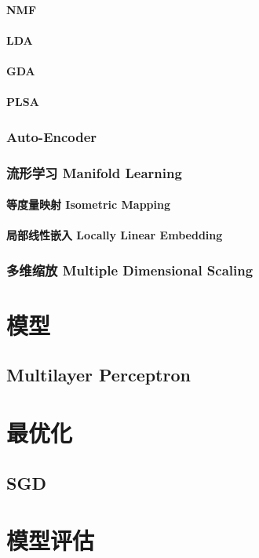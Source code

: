 \documentclass[oneside]{book}
\begin{document}
				\subsubsection{NMF}
				\subsubsection{LDA}
				\subsubsection{GDA}
				\subsubsection{PLSA}
				\subsection{Auto-Encoder}
				\subsection{流形学习 Manifold Learning}
					\subsubsection{等度量映射 Isometric Mapping}
					\subsubsection{局部线性嵌入 Locally Linear Embedding}
			\subsection{多维缩放 Multiple Dimensional Scaling}
			
		
	\chapter{模型}
		\section{Multilayer Perceptron}
	\chapter{最优化}
		\section{SGD}
	\chapter{模型评估}
\end{document}
